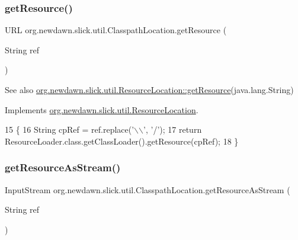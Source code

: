 \subsubsection{\texorpdfstring{get\+Resource()}{getResource()}}
{\footnotesize\ttfamily U\+RL org.\+newdawn.\+slick.\+util.\+Classpath\+Location.\+get\+Resource (\begin{DoxyParamCaption}\item[{String}]{ref }\end{DoxyParamCaption})\hspace{0.3cm}{\ttfamily [inline]}}

\begin{DoxySeeAlso}{See also}
\mbox{\hyperlink{interfaceorg_1_1newdawn_1_1slick_1_1util_1_1_resource_location_a3f83afd2bf20002625526dc19ddfff96}{org.\+newdawn.\+slick.\+util.\+Resource\+Location\+::get\+Resource}}(java.\+lang.\+String) 
\end{DoxySeeAlso}


Implements \mbox{\hyperlink{interfaceorg_1_1newdawn_1_1slick_1_1util_1_1_resource_location_a3f83afd2bf20002625526dc19ddfff96}{org.\+newdawn.\+slick.\+util.\+Resource\+Location}}.


\begin{DoxyCode}
15                                        \{
16         String cpRef = ref.replace(\textcolor{charliteral}{'\(\backslash\)\(\backslash\)'}, \textcolor{charliteral}{'/'});
17         \textcolor{keywordflow}{return} ResourceLoader.class.getClassLoader().getResource(cpRef);
18     \}
\end{DoxyCode}
\mbox{\label{classorg_1_1newdawn_1_1slick_1_1util_1_1_classpath_location_a452b5faed4fb19992109e2a1d9109ee4}} 
\subsubsection{\texorpdfstring{get\+Resource\+As\+Stream()}{getResourceAsStream()}}
{\footnotesize\ttfamily Input\+Stream org.\+newdawn.\+slick.\+util.\+Classpath\+Location.\+get\+Resource\+As\+Stream (\begin{DoxyParamCaption}\item[{String}]{ref }\end{DoxyParamCaption})\hspace{0.3cm}{\ttfamily [inline]}}

